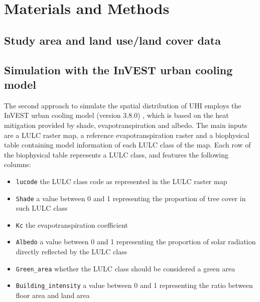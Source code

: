 \documentclass[10pt,letterpaper]{article}
\begin{document}







\section*{Materials and Methods}

\subsection*{Study area and land use/land cover data}



\subsection*{Simulation with the InVEST urban cooling model}

The second approach to simulate the spatial distribution of UHI employs the InVEST urban cooling model (version 3.8.0) \cite{sharp2020invest}, which is based on the heat mitigation provided by shade, evapotranspiration and albedo.
The main inputs are a LULC raster map, a reference evapotranspiration raster and a biophysical table containing model information of each LULC class of the map. Each row of the biophysical table represents a LULC class, and features the following columns:

\begin{itemize}
\item \texttt{lucode} the LULC class code as represented in the LULC raster map
\item \texttt{Shade} a value between 0 and 1 representing the proportion of tree cover in such LULC class
\item \texttt{Kc} the evapotranspiration coefficient
\item \texttt{Albedo} a value between 0 and 1 representing the proportion of solar radiation directly reflected by the LULC class
\item \texttt{Green\_area} whether the LULC class should be considered a green area
\item \texttt{Building\_intensity} a value between 0 and 1 representing the ratio between floor area and land area
\end{itemize}
\end{document}
